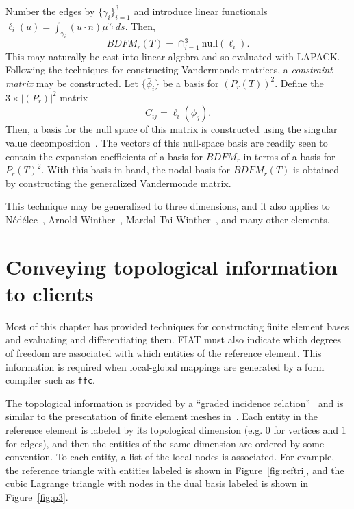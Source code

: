 Number the edges by \( \{ \gamma_i \}_{i=1}^3 \) and introduce
linear functionals \\
\( \ell_i(u) = \int_{\gamma_i} (u \cdot n)
\mu^{\gamma_i} \, ds \).  Then,
\[
BDFM_r(T) = \cap_{i=1}^3 \mathrm{null}(\ell_i).
\]
This may naturally be cast into linear algebra and so evaluated with
LAPACK.  Following the
techniques for constructing Vandermonde matrices, a \emph{constraint
  matrix} may be constructed.  Let \( \{ \bar{\phi}_i \} \) be a basis
for \( (P_r(T))^2 \).  Define the \( 3 \times |(P_r)|^2 \) matrix
\[
C_{ij} = \ell_i( \phi_j ).
\]
Then, a basis for the null space of this matrix is constructed using
the singular value decomposition~\cite{GolVan96}.  The vectors of this
null-space basis are readily seen to contain the expansion
coefficients of a basis for \( BDFM_r \) in terms of a basis for
\( P_r(T)^2 \).  With this basis in hand,
the nodal basis for \( BDFM_r(T) \) is obtained by constructing the
generalized Vandermonde matrix.

This technique may be generalized to three dimensions, and it also
applies to N\'ed\'elec~\cite{Ned80}, Arnold-Winther~\cite{ArnWin02},
Mardal-Tai-Winther~\cite{MarTai02},
and many other elements.

\section{Conveying topological information to clients}
Most of this chapter has provided techniques for constructing finite
element bases and evaluating and differentiating them.
FIAT must also indicate which degrees of freedom are
associated with which entities of the reference element.  This
information is required when local-global mappings are generated by a
form compiler such as \texttt{ffc}.

The topological information is provided by a ``graded incidence relation''~\cite{Kirby2006a,KnepleyKarpeev21007}
and is similar to the presentation of finite element meshes in~\cite{Log09}.
Each entity in the reference element is
labeled by its topological dimension (e.g. 0 for vertices and 1 for
edges), and then the entities of the same dimension are ordered by
some convention.  To each entity, a list of the local nodes is
associated.  For example, the reference triangle with entities labeled
is shown in Figure~\ref{fig:reftri}, and the
cubic Lagrange triangle with nodes in the dual basis labeled is
shown in Figure~\ref{fig:p3}.

